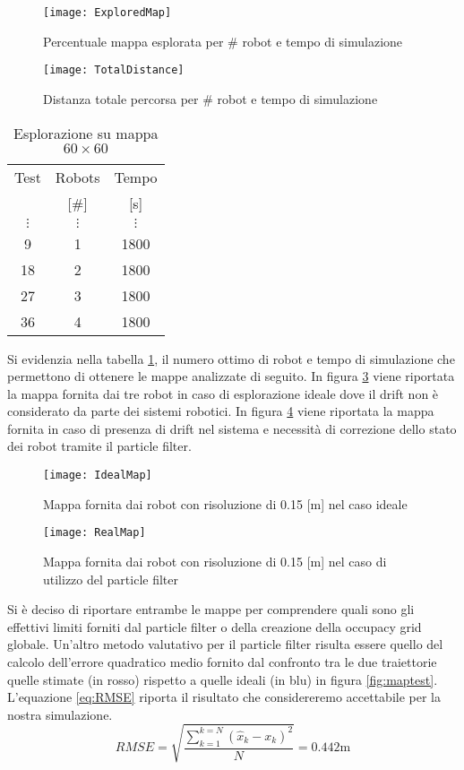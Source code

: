 \begin{figure}[htb]
	\centering
	\texttt{[image: ExploredMap]}
	\caption{Percentuale mappa esplorata per \# robot e tempo di simulazione}
	\label{fig:ExploredMap}
\end{figure}
%
\begin{figure}[htb]
	\centering
	\texttt{[image: TotalDistance]}
	\caption{Distanza totale percorsa per \# robot e tempo di simulazione}
	\label{fig:TotalDistance}
\end{figure}
\begin{table}[htb]
	\centering
	\caption{Esplorazione su mappa $60 \times 60$}
	\label{tab:optimalresults}
	\begin{tabular}{ccc}
	\toprule
	Test 		& 	Robots		&		Tempo\\
				&	[\#]			&		[\si{\second}]\\
	\midrule
								$\vdots$ & 	$\vdots$ & 	$\vdots$\\
      								9     	&		1	 	& 1800\\
		 							18 	& 		2 		& 1800\\
	\rowcolor[gray]{.9} 	27     & 		3 		& 1800\\
									36 	& 		4 		& 1800\\
     \bottomrule
\end{tabular}
\end{table}
%
\noindent
Si evidenzia nella tabella \ref{tab:optimalresults}, il numero ottimo di robot
e tempo di simulazione che permettono di ottenere le mappe analizzate di seguito.
In figura \ref{fig:IdealMap} viene riportata la mappa fornita dai tre robot in
caso di esplorazione ideale dove il drift non è considerato da parte dei sistemi
robotici.
In figura \ref{fig:RealMap} viene riportata la mappa fornita in caso di presenza
di drift nel sistema e necessità di correzione dello stato dei robot tramite il
particle filter.
\begin{figure}[htb]
	\centering
	\texttt{[image: IdealMap]}
	\caption{Mappa fornita dai robot con risoluzione di 0.15 [m] nel caso ideale}
\label{fig:IdealMap}
\end{figure}

\begin{figure}[!htb]
	\centering
	\texttt{[image: RealMap]}
	\caption{Mappa fornita dai robot con risoluzione di 0.15 [m] nel caso di utilizzo del particle filter }
\label{fig:RealMap}
\end{figure}
%
\noindent Si è deciso di riportare entrambe le mappe per comprendere quali sono 
gli effettivi limiti forniti dal particle filter o della creazione della 
occupacy grid globale.
Un'altro metodo valutativo per il particle filter risulta essere quello del
calcolo dell'errore quadratico medio fornito dal confronto tra le due
traiettorie quelle stimate (in rosso) rispetto a quelle ideali (in blu) in
figura \ref{fig:maptest}.
L'equazione \ref{eq:RMSE} riporta il risultato che considereremo accettabile per
la nostra simulazione.
%
\begin{equation}
RMSE = \sqrt{ \frac{\sum_{k=1}^{k=N}(\hat{x}_{k} - x_{k})^2 }{N}} = 0.442 \si{\metre}
\label{eq:RMSE}
\end{equation}

